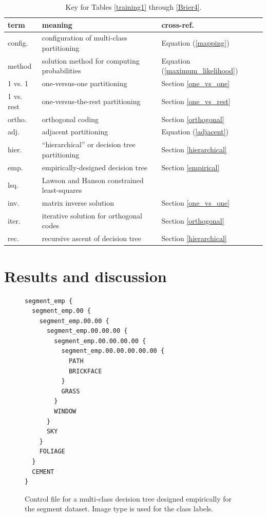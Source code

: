 \begin{table}
	\caption{Key for Tables \ref{training1} through \ref{Brier4}.}\label{key}
	\begin{tabular}{|lll|}
		\hline
		term & meaning & cross-ref. \\
		\hline\hline
		config. & configuration of multi-class partitioning & Equation (\ref{mapping}) \\
		method & solution method for computing probabilities & Equation (\ref{maximum_likelihood}) \\
		\hline
		1 vs. 1 & one-versus-one partitioning & Section \ref{one_vs_one} \\
		1 vs. rest & one-versus-the-rest partitioning & Section \ref{one_vs_rest} \\
		ortho. & orthogonal coding & Section \ref{orthogonal} \\
		adj. & adjacent partitioning & Equation (\ref{adjacent}) \\
		hier. & ``hierarchical'' or decision tree partitioning & Section \ref{hierarchical} \\
		emp. & empirically-designed decision tree & Section \ref{empirical} \\
		\hline
		lsq. & Lawson and Hanson constrained least-squares & \citep{Lawson_Hanson1995} \\
		inv. & matrix inverse solution & Section \ref{one_vs_one} \\
		iter. & iterative solution for orthogonal codes & Section \ref{orthogonal} \\
		rec. & recursive ascent of decision tree & Section \ref{hierarchical} \\
		\hline
	\end{tabular}
\end{table}


\section{Results and discussion}

\label{results}



\begin{figure}[htp]
	\begin{boxedminipage}{\textwidth}
		\begin{small}
		\begin{verbatim}
segment_emp {
  segment_emp.00 {
    segment_emp.00.00 {
      segment_emp.00.00.00 {
        segment_emp.00.00.00.00 {
          segment_emp.00.00.00.00.00 {
            PATH
            BRICKFACE
          }
          GRASS
        }
        WINDOW
      }
      SKY
    }
    FOLIAGE
  }
  CEMENT
}
		\end{verbatim}
		\end{small}
	\end{boxedminipage}
	\caption{Control file for a multi-class decision tree designed empirically for the segment dataset. Image type is used for the class labels.}
	\label{segment}
\end{figure}

